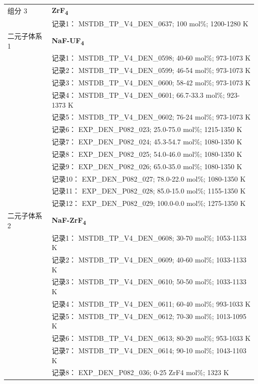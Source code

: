 \documentclass[12pt]{article}
\begin{document}
{\begin{longtable}[]{@{}
  >{\raggedright\arraybackslash}p{}
  >{\raggedright\arraybackslash}p{}@{}}
组分 3  & \textbf{ZrF\textsubscript{4}} \\
 & 记录1： MSTDB\_TP\_V4\_DEN\_0637; 100 mol\%; 1200-1280 K  \\

二元子体系 1  & \textbf{NaF-UF\textsubscript{4}} \\
 & 记录1： MSTDB\_TP\_V4\_DEN\_0598; 40-60 mol\%; 973-1073 K \\
 & 记录2： MSTDB\_TP\_V4\_DEN\_0599; 46-54 mol\%; 973-1073 K \\
 & 记录3： MSTDB\_TP\_V4\_DEN\_0600; 58-42 mol\%; 973-1073 K \\
 & 记录4： MSTDB\_TP\_V4\_DEN\_0601; 66.7-33.3 mol\%; 923-1373 K \\
 & 记录5： MSTDB\_TP\_V4\_DEN\_0602; 76-24 mol\%; 973-1073 K \\
 & 记录6： EXP\_DEN\_P082\_023; 25.0-75.0 mol\%; 1215-1350 K \\
 & 记录7： EXP\_DEN\_P082\_024; 45.3-54.7 mol\%; 1080-1350 K \\
 & 记录8： EXP\_DEN\_P082\_025; 54.0-46.0 mol\%; 1080-1350 K \\
 & 记录9： EXP\_DEN\_P082\_026; 65.0-35.0 mol\%; 1080-1350 K \\
 & 记录10： EXP\_DEN\_P082\_027; 78.0-22.0 mol\%; 1080-1350 K \\
 & 记录11： EXP\_DEN\_P082\_028; 85.0-15.0 mol\%; 1155-1350 K \\
 & 记录12： EXP\_DEN\_P082\_029; 100.0-0.0 mol\%; 1275-1350 K  \\

二元子体系 2  & \textbf{NaF-ZrF\textsubscript{4}} \\
 & 记录1： MSTDB\_TP\_V4\_DEN\_0608; 30-70 mol\%; 1053-1133 K \\
 & 记录2： MSTDB\_TP\_V4\_DEN\_0609; 40-60 mol\%; 1033-1133 K \\
 & 记录3： MSTDB\_TP\_V4\_DEN\_0610; 50-50 mol\%; 1033-1133 K \\
 & 记录4： MSTDB\_TP\_V4\_DEN\_0611; 60-40 mol\%; 993-1033 K \\
 & 记录5： MSTDB\_TP\_V4\_DEN\_0612; 70-30 mol\%; 1013-1095 K \\
 & 记录6： MSTDB\_TP\_V4\_DEN\_0613; 80-20 mol\%; 953-1033 K \\
 & 记录7： MSTDB\_TP\_V4\_DEN\_0614; 90-10 mol\%; 1043-1103 K \\
 & 记录8： EXP\_DEN\_P082\_036; 0-25 ZrF4 mol\%; 1323 K  \\


\end{longtable}}
\end{document}
